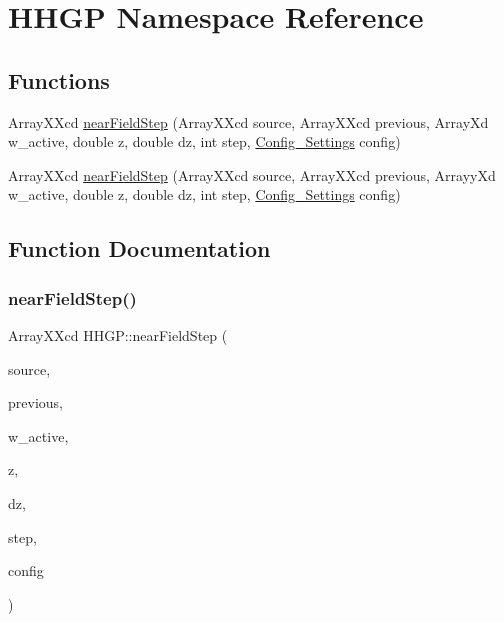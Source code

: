 \hypertarget{namespace_h_h_g_p}{}\section{H\+H\+GP Namespace Reference}
\label{namespace_h_h_g_p}
\subsection*{Functions}
\begin{DoxyCompactItemize}
\item 
Array\+X\+Xcd \hyperlink{namespace_h_h_g_p_ac1baa8acdff84a0c6de695d1d148b778}{near\+Field\+Step} (Array\+X\+Xcd source, Array\+X\+Xcd previous, Array\+Xd w\+\_\+active, double z, double dz, int step, \hyperlink{class_config___settings}{Config\+\_\+\+Settings} config)
\item 
Array\+X\+Xcd \hyperlink{namespace_h_h_g_p_af5edf9500b83667487124152cdeb3f0a}{near\+Field\+Step} (Array\+X\+Xcd source, Array\+X\+Xcd previous, Arrayy\+Xd w\+\_\+active, double z, double dz, int step, \hyperlink{class_config___settings}{Config\+\_\+\+Settings} config)
\end{DoxyCompactItemize}


\subsection{Function Documentation}
\mbox{\label{namespace_h_h_g_p_af5edf9500b83667487124152cdeb3f0a}} 
\subsubsection{\texorpdfstring{near\+Field\+Step()}{nearFieldStep()}\hspace{0.1cm}{\footnotesize\ttfamily [1/2]}}
{\footnotesize\ttfamily Array\+X\+Xcd H\+H\+G\+P\+::near\+Field\+Step (\begin{DoxyParamCaption}\item[{Array\+X\+Xcd}]{source,  }\item[{Array\+X\+Xcd}]{previous,  }\item[{Arrayy\+Xd}]{w\+\_\+active,  }\item[{double}]{z,  }\item[{double}]{dz,  }\item[{int}]{step,  }\item[{\hyperlink{class_config___settings}{Config\+\_\+\+Settings}}]{config }\end{DoxyParamCaption})}

